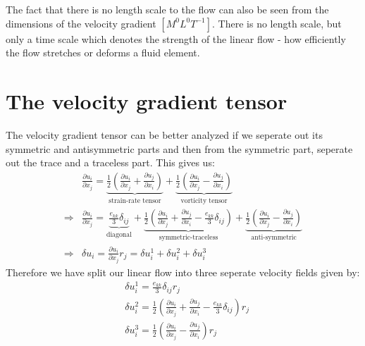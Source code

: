 \documentclass[11pt,a4paper]{article}
\newcommand{\dl}{\delta}
\newcommand{\dij}{\delta_{ij}}
\newcommand{\pd}[2]{\frac{\partial #1}{\partial #2}}
\newcommand{\describe}[2]{\underbrace{#2}_{\text{#1}}}%
\newcommand{\1}{\vect{1}}
\newcommand{\RA}{\Rightarrow}
\newcommand{\half}{\frac{1}{2}}
\begin{document}
The fact that there is no length scale to the flow can also be seen from the dimensions of the velocity gradient $[M^0 L^0 T^{-1}]$. There is no length scale, but only a time scale which denotes the strength of the linear flow - how efficiently the flow stretches or deforms a fluid element. 

\section{The velocity gradient tensor}

The velocity gradient tensor can be better analyzed if we seperate out its symmetric and antisymmetric parts and then from the symmetric part, seperate out the trace and a traceless part. This gives us:
\begin{align*}
&\pd{u_i}{x_j} = \describe{strain-rate tensor}{\half(\pd{u_i}{x_j} + \pd{u_j}{x_i})} + \describe{vorticity tensor}{\half(\pd{u_i}{x_j} - \pd{u_j}{x_i})}\\
\RA&\pd{u_i}{x_j} = \describe{diagonal}{\frac{e_{kk}}{3}\dij} + \describe{symmetric-traceless}{\half(\pd{u_i}{x_j} + \pd{u_j}{x_i} - \frac{e_{kk}}{3}\dij)} + \describe{anti-symmetric}{\half(\pd{u_i}{x_j} - \pd{u_j}{x_i})}\\
\RA& \dl u_i = \pd{u_i}{x_j}r_j = \dl u^1_i + \dl u^2_i + \dl u^3_i
\end{align*}
Therefore we have split our linear flow into three seperate velocity fields given by:
\begin{align*}
&\dl u^1_i = \frac{e_{kk}}{3}\dij r_j\\
&\dl u^2_i = \half(\pd{u_i}{x_j} + \pd{u_j}{x_i} - \frac{e_{kk}}{3}\dij) r_j\\
&\dl u^3_i = \half(\pd{u_i}{x_j} - \pd{u_j}{x_i}) r_j
\end{align*}
\end{document}
